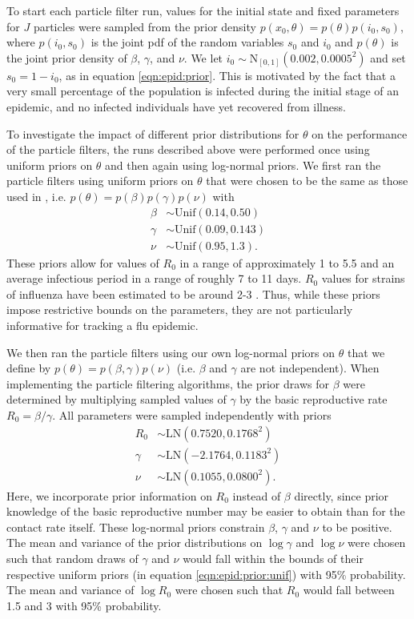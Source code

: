 To start each particle filter run, values for the initial state and fixed parameters for $J$ particles were sampled from the prior density $p(x_0,\theta) = p(\theta)p(i_0,s_0)$, where $p(i_0,s_0)$ is the joint pdf of the random variables $s_0$ and $i_0$ and $p(\theta)$ is the joint prior density of $\beta$, $\gamma$, and $\nu$. We let $i_0 \sim \mbox{N}_{[0,1]}(0.002,0.0005^2)$ and set $s_0 = 1 - i_0$, as in equation \eqref{eqn:epid:prior}. This is motivated by the fact that a very small percentage of the population is infected during the initial stage of an epidemic, and no infected individuals have yet recovered from illness.

To investigate the impact of different prior distributions for $\theta$ on the performance of the particle filters, the runs described above were performed once using uniform priors on $\theta$ and then again using log-normal priors. We first ran the particle filters using uniform priors on $\theta$ that were chosen to be the same as those used in \citet{skvortsov2012monitoring}, i.e. $p(\theta) = p(\beta)p(\gamma)p(\nu)$ with
\begin{align}
\beta &\sim \mbox{Unif}(0.14, 0.50) \label{eqn:epid:prior:unif} \\
\gamma &\sim \mbox{Unif}(0.09, 0.143) \nonumber \\
\nu &\sim \mbox{Unif}(0.95, 1.3). \nonumber
\end{align}
These priors allow for values of $R_0$ in a range of approximately 1 to 5.5 and an average infectious period in a range of roughly 7 to 11 days. $R_0$ values for strains of influenza have been estimated to be around 2-3 \citep{mills2004influenza, heff2005repratio, zhang2011flu}. Thus, while these priors impose restrictive bounds on the parameters, they are not particularly informative for tracking a flu epidemic.

We then ran the particle filters using our own log-normal priors on $\theta$ that we define by $p(\theta) = p(\beta, \gamma)p(\nu)$ (i.e. $\beta$ and $\gamma$ are not independent). When implementing the particle filtering algorithms, the prior draws for $\beta$ were determined by multiplying sampled values of $\gamma$ by the basic reproductive rate $R_0 = \beta / \gamma$. All parameters were sampled independently with priors
\begin{align}
R_0 &\sim \mbox{LN}(0.7520, 0.1768^2) \label{eqn:epid:prior:ln} \\
\gamma &\sim \mbox{LN}(-2.1764, 0.1183^2) \nonumber \\
\nu &\sim \mbox{LN}(0.1055, 0.0800^2). \nonumber
\end{align}
Here, we incorporate prior information on $R_0$ instead of $\beta$ directly, since prior knowledge of the basic reproductive number may be easier to obtain than for the contact rate itself. These log-normal priors constrain $\beta$, $\gamma$ and $\nu$ to be positive. The mean and variance of the prior distributions on $\log \gamma$ and $\log \nu$ were chosen such that random draws of $\gamma$ and $\nu$ would fall within the bounds of their respective uniform priors (in equation \eqref{eqn:epid:prior:unif}) with 95\% probability. The mean and variance of $\log R_0$ were chosen such that $R_0$ would fall between 1.5 and 3 with 95\% probability.

